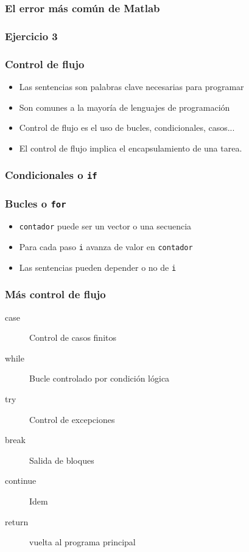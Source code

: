 \documentclass[12pt]{beamer}
\begin{document}
\begin{large}
\begin{frame}
\frametitle{El error más común de Matlab}
\testcode
\end{frame}

\begin{frame}
\frametitle{Ejercicio 3}
\end{frame}

\begin{frame}
\frametitle{Control de flujo}
\begin{itemize}
\item Las sentencias son palabras clave necesarias para programar
\item Son comunes a la mayoría de lenguajes de programación
\item Control de flujo es el uso de bucles, condicionales, casos...
\item El control de flujo implica el encapsulamiento de una tarea.
\end{itemize}
\end{frame}


\begin{frame}
\frametitle{Condicionales o \texttt{if}}
\testcode
\end{frame}


\begin{frame}
\frametitle{Bucles o \texttt{for}}
\testcode
\begin{itemize}
\item \texttt{contador} puede ser un vector o una secuencia
\item Para cada paso \texttt{i} avanza de valor en \texttt{contador}
\item Las sentencias pueden depender o no de \texttt{i}
\end{itemize}
\end{frame}


\begin{frame}
\frametitle{Más control de flujo}
\begin{description}
\item[case] Control de casos finitos
\item[while] Bucle controlado por condición lógica
\item[try] Control de excepciones
\item[break] Salida de bloques
\item[continue] Idem
\item[return] vuelta al programa principal
\end{description}
\end{frame}


\end{large}
\end{document}
